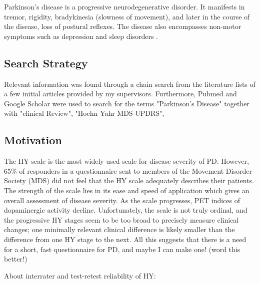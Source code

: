Parkinson's disease is a progressive neurodegenerative disorder. It manifests in tremor, rigidity, bradykinesia (slowness of movement), and later in the course of the disease, loss of postural reflexes. The disease also encompasses non-motor symptoms such as depression and sleep disorders \cite{Kalia2015}. 



\subsection{Search Strategy}
Relevant information was found through a chain search from the literature lists of a few initial articles provided by my supervisors. Furthermore, Pubmed and Google Scholar were used to search for the terms "Parkinson's Disease" together with "clinical Review", "Hoehn Yahr MDS-UPDRS", 


\subsection{Motivation} %
The HY scale is the most widely used scale for disease severity of PD. However, 65\% of responders in a questionnaire sent to members of the Movement Disorder Society (MDS) did not feel that the HY scale adequately describes their patients. The strength of the scale lies in its ease and speed of application which gives an overall assessment of disease severity. As the scale progresses, PET indices of dopaminergic activity decline. Unfortunately, the scale is not truly ordinal, and the progressive HY stages seem to be too broad to precisely measure clinical changes; one minimally relevant clinical difference is likely smaller than the difference from one HY stage to the next.
All this suggests that there is a need for a short, fast questionnaire for PD, and maybe I can make one! (word this better!)
\cite{Goetz2004}

About interrater and test-retest reliability of HY: \cite{Martinez-Martin2018}



